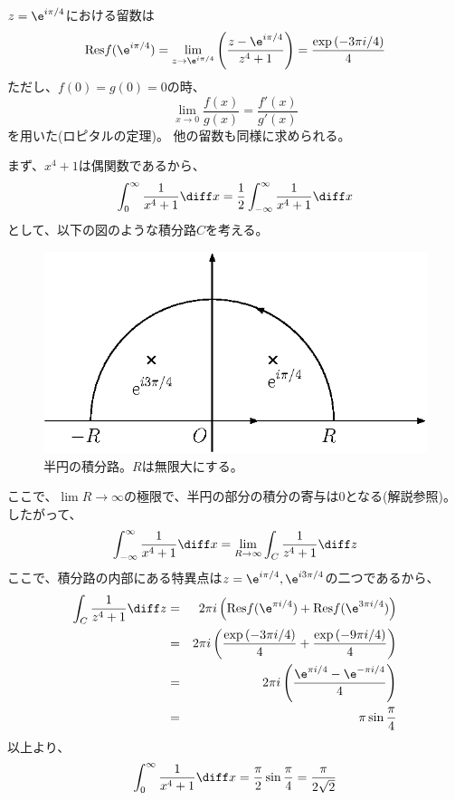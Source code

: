 $z = \e^{i \pi /4}$における留数は
\begin{equation}
  \mbox{Res} f(\e^{i \pi /4}) = \lim_{z \rightarrow \e^{i \pi /4}} \left( \frac{z-\e^{i \pi /4}}{z^4+1} \right)
  = \frac{\exp{(-3\pi i/4})}{4}
\end{equation}
ただし、$f(0)=g(0)=0$の時、
\begin{equation}
  \lim_{x\rightarrow 0} \frac{f(x)}{g(x)} = \frac{f'(x)}{g'(x)}
\end{equation}
を用いた(ロピタルの定理)。
他の留数も同様に求められる。

まず、$x^4+1$は偶関数であるから、
\begin{equation}
  \int_0^{\infty} \frac{1}{x^4+1} \diff x = \frac{1}{2} \int_{-\infty}^{\infty}  \frac{1}{x^4+1} \diff x
\end{equation}
として、以下の図のような積分路$C$を考える。
\begin{figure}[htbp]
  \begin{center}
    \includegraphics[width=.5\linewidth]{fig/z_int2.eps}
  \end{center}
  \caption{
    半円の積分路。$R$は無限大にする。
  }
  \label{fig_z_int2}
\end{figure}
ここで、$\lim R \rightarrow \infty$の極限で、半円の部分の積分の寄与は$0$となる(解説参照)。
したがって、
\begin{equation}
  \int_{-\infty}^{\infty} \frac{1}{x^4+1} \diff x = \lim_{R \rightarrow \infty} \int_C \frac{1}{z^4+1} \diff z
\end{equation}
ここで、積分路の内部にある特異点は$z = \e^{i\pi/4},\e^{i3\pi/4}$の二つであるから、
\begin{eqnarray}
  \int_C \frac{1}{z^4+1} \diff z &=& 2 \pi i \left( \mbox{Res} f(\e^{\pi i/4}) +\mbox{Res} f(\e^{3\pi i/4})  \right)\\
  &=& 2 \pi i \left(  \frac{\exp{(-3\pi i /4})}{4} + \frac{\exp{(-9 \pi i /4})}{4}  \right)\\
  &=& 2 \pi i \left(  \frac{\e^{\pi i/4}-\e^{- \pi i/4}}{4}  \right)\\
  &=& \pi \sin \frac{\pi}{4}
\end{eqnarray}
以上より、
\begin{equation}
  \int_0^{\infty} \frac{1}{x^4+1} \diff x = \frac{\pi}{2} \sin \frac{\pi}{4} = \frac{\pi}{2\sqrt{2}}
\end{equation}

